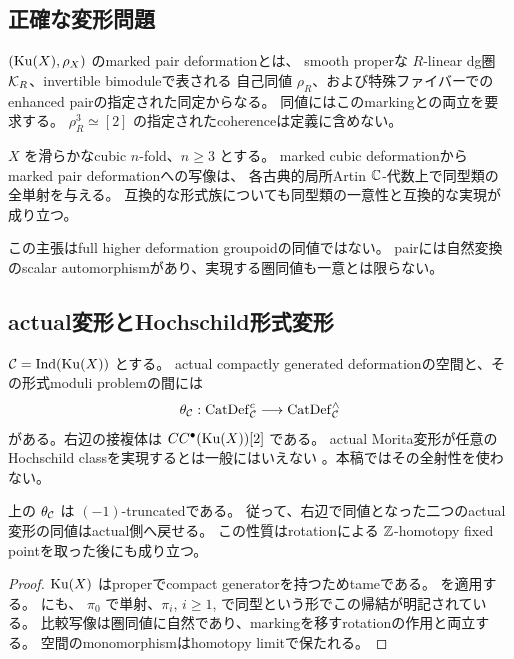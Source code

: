 \subsection{正確な変形問題}

\begin{definition}
 \((\operatorname{Ku}(X),\rho_X)\) のmarked pair deformationとは、
 smooth properな \(R\)-linear dg圏 \(\mathcal K_R\)、invertible bimoduleで表される
 自己同値 \(\rho_R\)、および特殊ファイバーでのenhanced pairの指定された同定からなる。
 同値にはこのmarkingとの両立を要求する。
 \(\rho_R^3\simeq[2]\) の指定されたcoherenceは定義に含めない。
\end{definition}

\begin{theorem}[pairの形式的復元]\label{thm:pair}
 \(X\) を滑らかなcubic \(n\)-fold、\(n\ge3\) とする。
 marked cubic deformationからmarked pair deformationへの写像は、
 各古典的局所Artin \(\mathbb C\)-代数上で同型類の全単射を与える。
 互換的な形式族についても同型類の一意性と互換的な実現が成り立つ。
\end{theorem}

この主張はfull higher deformation groupoidの同値ではない。
pairには自然変換のscalar automorphismがあり、実現する圏同値も一意とは限らない。

\subsection{actual変形とHochschild形式変形}

\(\mathcal C=\operatorname{Ind}(\operatorname{Ku}(X))\) とする。
actual compactly generated deformationの空間と、その形式moduli problemの間には
\[
 \theta_{\mathcal C}:\operatorname{CatDef}_{\mathcal C}^{c}
 \longrightarrow\operatorname{CatDef}_{\mathcal C}^{\wedge}
\]
がある。右辺の接複体は \(CC^\bullet(\operatorname{Ku}(X))[2]\) である。
actual Morita変形が任意のHochschild classを実現するとは一般にはいえない
\cite{KL}。本稿ではその全射性を使わない。

\begin{lemma}\label{lem:theta}
 上の \(\theta_{\mathcal C}\) は \((-1)\)-truncatedである。
 従って、右辺で同値となった二つのactual変形の同値はactual側へ戻せる。
 この性質はrotationによる \(\mathbb Z\)-homotopy fixed pointを取った後にも成り立つ。
\end{lemma}
\begin{proof}
 \(\operatorname{Ku}(X)\) はproperでcompact generatorを持つためtameである。
 \cite[Proposition 5.3.21, Theorem 5.1.9]{Lurie} を適用する。
 \cite[Definition 3.3, Section 3.3]{BKP} にも、
 \(\pi_0\) で単射、\(\pi_i\), \(i\ge1\), で同型という形でこの帰結が明記されている。
 比較写像は圏同値に自然であり、markingを移すrotationの作用と両立する。
 空間のmonomorphismはhomotopy limitで保たれる。
\end{proof}

